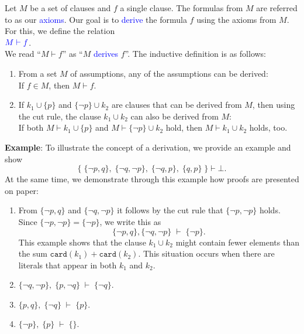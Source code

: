 \begin{Definition} \hspace*{\fill} \linebreak
    Let $M$ be a set of clauses and $f$ a single clause.  
    The formulas from $M$ are referred to as our \textcolor{blue}{axioms}. Our goal is to \textcolor{blue}{derive} the formula $f$ using the axioms from $M$.
    For this, we define the relation \\[0.2cm]
    \hspace*{1.3cm}
    ${\color{blue}M \vdash f}$. \\[0.2cm]
    We read ``$M \vdash f$'' as ``$M$ \textcolor{blue}{derives} $f$''. The inductive definition is as follows:
    \begin{enumerate}
    \item From a set $M$ of assumptions, any of the assumptions can be derived: \\[0.2cm]
          \hspace*{0.3cm} 
          If \quad $f \in M$, \quad then \quad $M \vdash f$.
    \item If $k_1 \cup \{p\}$ and $\{ \neg p \} \cup k_2$ are clauses that can be derived from $M$,
          then using the cut rule, the clause $k_1 \cup k_2$ can also be derived from $M$: \\[0.2cm]
          \hspace*{0.3cm} 
          If both \quad $M \vdash k_1 \cup \{p\}$ \quad and \quad $M \vdash \{ \neg p \} \cup k_2$ \quad
          hold, then \quad $M \vdash k_1 \cup k_2$ \quad holds, too.
    \eox
    \end{enumerate}
\end{Definition}

\noindent
\textbf{Example}: To illustrate the concept of a derivation, we provide an example and
show
\[ \bigl\{\; \{\neg p, q\},\; \{ \neg q, \neg p \},\; \{ \neg q, p \},\; \{ q, p \}\; \bigr\} \vdash \bot.
\]
At the same time, we demonstrate through this example how proofs are presented on paper:
\begin{enumerate}
\item From $\{\neg p, q \}$ and $\{ \neg q, \neg p \}$ it follows by the cut rule that   
      $\{ \neg p, \neg p \}$ holds. Since $\{ \neg p, \neg p \} = \{ \neg p \}$,
      we write this as 
      \[ \{\neg p, q \}, \{ \neg q, \neg p \} \;\vdash\; \{ \neg p \}. \]
      \remarkEng
      This example shows that the clause $k_1 \cup k_2$ might contain fewer
      elements than the sum $\mathtt{card}(k_1) + \mathtt{card}(k_2)$. This
      situation occurs when there are literals that appear in both $k_1$ and $k_2$.
\item $\{\neg q, \neg p \},\; \{ p, \neg q \} \;\vdash\; \{ \neg q \}$. 
\item $\{ p, q \},\; \{ \neg q \} \;\vdash\; \{ p \}$. 
\item $\{ \neg p \},\; \{ p \} \;\vdash\; \{\}$. 
\end{enumerate}

